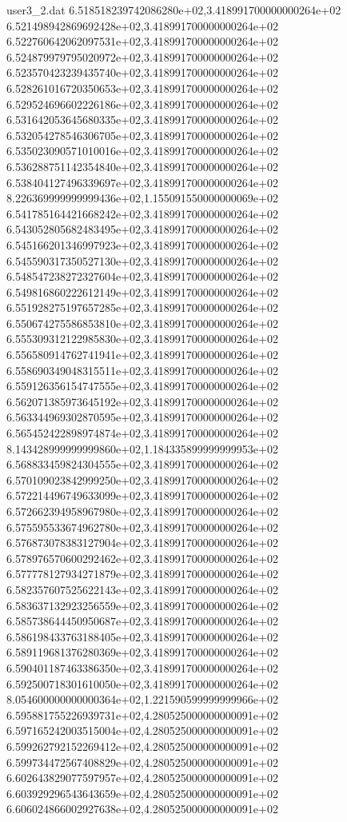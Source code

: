 \begin{filecontents}{user3_2.dat}
6.518518239742086280e+02,3.418991700000000264e+02
6.521498942869692428e+02,3.418991700000000264e+02
6.522760642062097531e+02,3.418991700000000264e+02
6.524879979795020972e+02,3.418991700000000264e+02
6.523570423239435740e+02,3.418991700000000264e+02
6.528261016720350653e+02,3.418991700000000264e+02
6.529524696602226186e+02,3.418991700000000264e+02
6.531642053645680335e+02,3.418991700000000264e+02
6.532054278546306705e+02,3.418991700000000264e+02
6.535023090571010016e+02,3.418991700000000264e+02
6.536288751142354840e+02,3.418991700000000264e+02
6.538404127496339697e+02,3.418991700000000264e+02
8.226369999999999436e+02,1.155091550000000069e+02
6.541785164421668242e+02,3.418991700000000264e+02
6.543052805682483495e+02,3.418991700000000264e+02
6.545166201346997923e+02,3.418991700000000264e+02
6.545590317350527130e+02,3.418991700000000264e+02
6.548547238272327604e+02,3.418991700000000264e+02
6.549816860222612149e+02,3.418991700000000264e+02
6.551928275197657285e+02,3.418991700000000264e+02
6.550674275586853810e+02,3.418991700000000264e+02
6.555309312122985830e+02,3.418991700000000264e+02
6.556580914762741941e+02,3.418991700000000264e+02
6.558690349048315511e+02,3.418991700000000264e+02
6.559126356154747555e+02,3.418991700000000264e+02
6.562071385973645192e+02,3.418991700000000264e+02
6.563344969302870595e+02,3.418991700000000264e+02
6.565452422898974874e+02,3.418991700000000264e+02
8.143428999999999860e+02,1.184335899999999953e+02
6.568833459824304555e+02,3.418991700000000264e+02
6.570109023842999250e+02,3.418991700000000264e+02
6.572214496749633099e+02,3.418991700000000264e+02
6.572662394958967980e+02,3.418991700000000264e+02
6.575595533674962780e+02,3.418991700000000264e+02
6.576873078383127904e+02,3.418991700000000264e+02
6.578976570600292462e+02,3.418991700000000264e+02
6.577778127934271879e+02,3.418991700000000264e+02
6.582357607525622143e+02,3.418991700000000264e+02
6.583637132923256559e+02,3.418991700000000264e+02
6.585738644450950687e+02,3.418991700000000264e+02
6.586198433763188405e+02,3.418991700000000264e+02
6.589119681376280369e+02,3.418991700000000264e+02
6.590401187463386350e+02,3.418991700000000264e+02
6.592500718301610050e+02,3.418991700000000264e+02
8.054600000000000364e+02,1.221590599999999966e+02
6.595881755226939731e+02,4.280525000000000091e+02
6.597165242003515004e+02,4.280525000000000091e+02
6.599262792152269412e+02,4.280525000000000091e+02
6.599734472567408829e+02,4.280525000000000091e+02
6.602643829077597957e+02,4.280525000000000091e+02
6.603929296543643659e+02,4.280525000000000091e+02
6.606024866002927638e+02,4.280525000000000091e+02

\end{filecontents}
